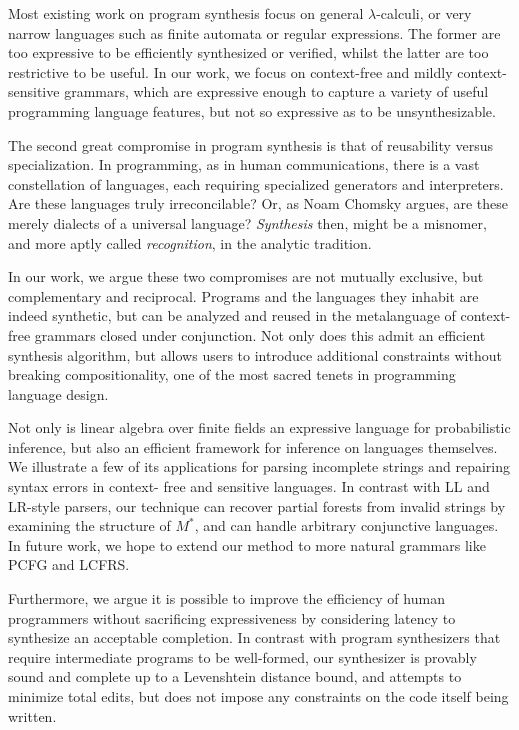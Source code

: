 \documentclass[sigplan,review,anonymous,acmsmall]{acmart}\settopmatter{printfolios=false,printccs=false,printacmref=false}
\begin{document}
Most existing work on program synthesis focus on general $\lambda$-calculi, or very narrow languages such as finite automata or regular expressions. The former are too expressive to be efficiently synthesized or verified, whilst the latter are too restrictive to be useful. In our work, we focus on context-free and mildly context-sensitive grammars, which are expressive enough to capture a variety of useful programming language features, but not so expressive as to be unsynthesizable.

The second great compromise in program synthesis is that of reusability versus specialization. In programming, as in human communications, there is a vast constellation of languages, each requiring specialized generators and interpreters. Are these languages truly irreconcilable? Or, as Noam Chomsky argues, are these merely dialects of a universal language? \textit{Synthesis} then, might be a misnomer, and more aptly called \textit{recognition}, in the analytic tradition.

In our work, we argue these two compromises are not mutually exclusive, but complementary and reciprocal. Programs and the languages they inhabit are indeed synthetic, but can be analyzed and reused in the metalanguage of context-free grammars closed under conjunction. Not only does this admit an efficient synthesis algorithm, but allows users to introduce additional constraints without breaking compositionality, one of the most sacred tenets in programming language design.

Not only is linear algebra over finite fields an expressive language for probabilistic inference, but also an efficient framework for inference on languages themselves. We illustrate a few of its applications for parsing incomplete strings and repairing syntax errors in context- free and sensitive languages. In contrast with LL and LR-style parsers, our technique can recover partial forests from invalid strings by examining the structure of $M^*$, and can handle arbitrary conjunctive languages. In future work, we hope to extend our method to more natural grammars like PCFG and LCFRS.

Furthermore, we argue it is possible to improve the efficiency of human programmers without sacrificing expressiveness by considering latency to synthesize an acceptable completion. In contrast with program synthesizers that require intermediate programs to be well-formed, our synthesizer is provably sound and complete up to a Levenshtein distance bound, and attempts to minimize total edits, but does not impose any constraints on the code itself being written.
\end{document}
